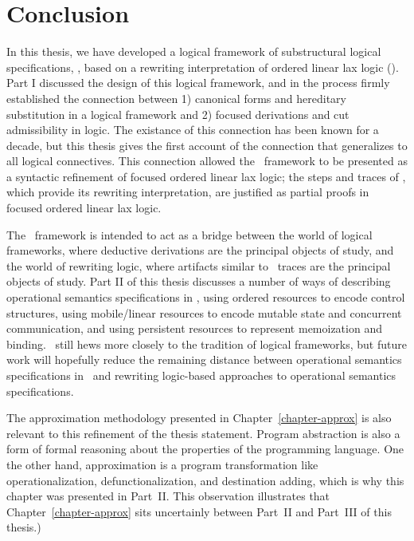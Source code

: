 \chapter{Conclusion}
\label{chapter-conclusion}

In this thesis, we have developed a logical framework of substructural
logical specifications, \sls, based on a rewriting interpretation of
ordered linear lax logic (\ollll). Part I discussed the design of this
logical framework, and in the process firmly established the
connection between 1) canonical forms and hereditary substitution in a
logical framework and 2) focused derivations and cut admissibility in
logic. The existance of this connection has been known for a decade,
but this thesis gives the first account of the connection that
generalizes to all logical connectives. This connection allowed the
\sls~framework to be presented as a syntactic refinement of focused
ordered linear lax logic; the steps and traces of \sls, which provide
its rewriting interpretation, are justified as partial proofs in
focused ordered linear lax logic.

The \sls~framework is intended to act as a bridge between the world of
logical frameworks, where deductive derivations are the principal
objects of study, and the world of rewriting logic, where artifacts
similar to \sls~traces are the principal objects of study. Part II of
this thesis discusses a number of ways of describing operational
semantics specifications in \sls, using ordered resources to encode
control structures, using mobile/linear resources to encode mutable
state and concurrent communication, and using persistent resources to
represent memoization and binding. \sls~still hews more closely to the
tradition of logical frameworks, but future work will hopefully reduce
the remaining distance between operational semantics specifications in
\sls~and rewriting logic-based approaches to operational semantics
specifications.

The approximation methodology presented in
Chapter~\ref{chapter-approx} is also relevant to this refinement of
the thesis statement. Program abstraction is also a form of formal
reasoning about the properties of the programming language. One the
other hand, approximation is a program transformation like
operationalization, defunctionalization, and destination adding, which
is why this chapter was presented in Part~II. This observation
illustrates that Chapter~\ref{chapter-approx} sits uncertainly between
Part~II and Part~III of this thesis.)

